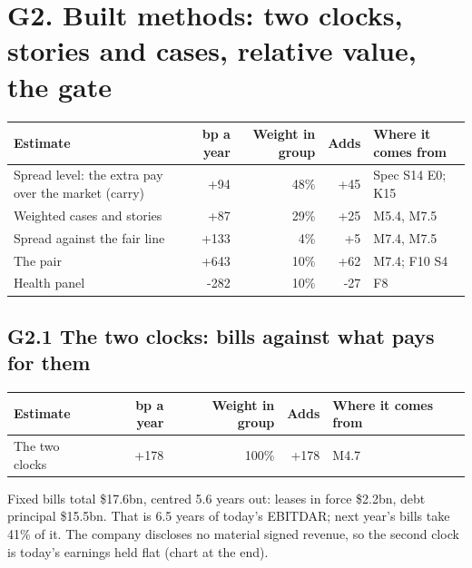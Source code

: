 \documentclass[11pt,a4paper]{article}
\begin{document}
\section*{G2. Built methods: two clocks, stories and cases, relative value, the gate}
\par\noindent{}
\begin{center}\footnotesize\setlength{\tabcolsep}{3.5pt}\begin{tabular}{@{}p{6.2cm}rrrp{4.2cm}@{}}\toprule
Estimate & bp a year & Weight in group & Adds & Where it comes from \\\midrule
Spread level: the extra pay over the market (carry) & +94 & 48\% & +45 & Spec S14 E0; K15 \\
Weighted cases and stories & +87 & 29\% & +25 & M5.4, M7.5 \\
Spread against the fair line & +133 & 4\% & +5 & M7.4, M7.5 \\
The pair & +643 & 10\% & +62 & M7.4; F10 S4 \\
Health panel & -282 & 10\% & -27 & F8 \\
\bottomrule\end{tabular}\end{center}
\subsection*{G2.1 The two clocks: bills against what pays for them}
\par\noindent{}
\begin{center}\footnotesize\setlength{\tabcolsep}{3.5pt}\begin{tabular}{@{}p{6.2cm}rrrp{4.2cm}@{}}\toprule
Estimate & bp a year & Weight in group & Adds & Where it comes from \\\midrule
The two clocks & +178 & 100\% & +178 & M4.7 \\
\bottomrule\end{tabular}\end{center}
Fixed bills total \$17.6bn, centred 5.6 years out: leases in force \$2.2bn, debt principal \$15.5bn. That is 6.5 years of today's EBITDAR; next year's bills take 41\% of it.
The company discloses no material signed revenue, so the second clock is today's earnings held flat (chart at the end).
\end{document}
